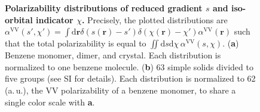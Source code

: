 \begin{figure}[t!]
\caption{\textbf{Polarizability distributions of reduced gradient $s$ and iso-orbital indicator $\chi$.}
Precisely, the plotted distributions are $\alpha^\text{VV}(s',\chi')=\int\mathrm d\mathbf r\delta(s(\mathbf r)-s')\delta(\chi(\mathbf r)-\chi')\alpha^\text{VV}(\mathbf r)$ such that the total polarizability is equal to $\iint\mathrm ds\mathrm d\chi\,\alpha^\text{VV}(s,\chi)$.
(\textbf a) Benzene monomer, dimer, and crystal.
Each distribution is normalized to one benzene molecule.
(\textbf b) 63 simple solids divided to five groups (see SI for details).
Each distribution is normalized to 62 (a.\,u.), the VV polarizability of a benzene monomer, to share a single color scale with \textbf{a}.
}\label{fig:pol-hists}
\end{figure}

